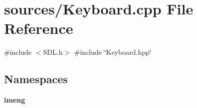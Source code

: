 \section{sources/\+Keyboard.cpp File Reference}
\label{_keyboard_8cpp}
{\ttfamily \#include $<$S\+D\+L.\+h$>$}\newline
{\ttfamily \#include \char`\"{}Keyboard.\+hpp\char`\"{}}\newline
\subsection*{Namespaces}
\begin{DoxyCompactItemize}
\item 
 \textbf{ imeng}
\end{DoxyCompactItemize}
